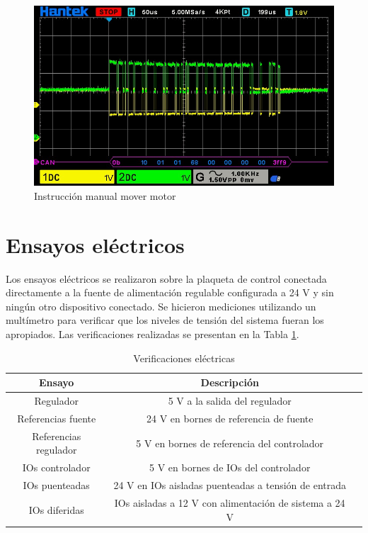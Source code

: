\begin{figure}[htbp]
	\centering
	\includegraphics[scale=0.6]{./Figures/Motor_Manual_Move_CCW_360DEG.jpg}
	\caption{Instrucción manual mover motor}
	\label{fig:mot_move}
\end{figure}


\section{Ensayos eléctricos}

Los ensayos eléctricos se realizaron sobre la plaqueta de control conectada directamente a la fuente de alimentación regulable configurada a 24 V y sin ningún otro dispositivo conectado. Se hicieron mediciones utilizando un multímetro para verificar que los niveles de tensión del sistema fueran los apropiados. Las verificaciones realizadas se presentan en la Tabla \ref{tab:verificaciones_electricas}.

\begin{table}[h]
	\centering
	\caption[Verificaciones eléctricas]{Verificaciones eléctricas}
	\begin{tabular}{c c c}    
		\toprule
		\textbf{Ensayo} 	 & 		\textbf{Descripción} \\
		\midrule
		Regulador & 5 V a la salida del regulador\\
		Referencias fuente & 24 V en bornes de referencia de fuente \\
		Referencias regulador & 5 V en bornes de referencia del controlador \\
		IOs controlador & 5 V en bornes de IOs del controlador \\		
		IOs puenteadas 	& 24 V en IOs aisladas puenteadas a tensión de entrada \\
		IOs	diferidas	& IOs aisladas a 12 V con alimentación de sistema a 24 V \\
		\bottomrule
		\hline
	\end{tabular}
	\label{tab:verificaciones_electricas}
\end{table} 

